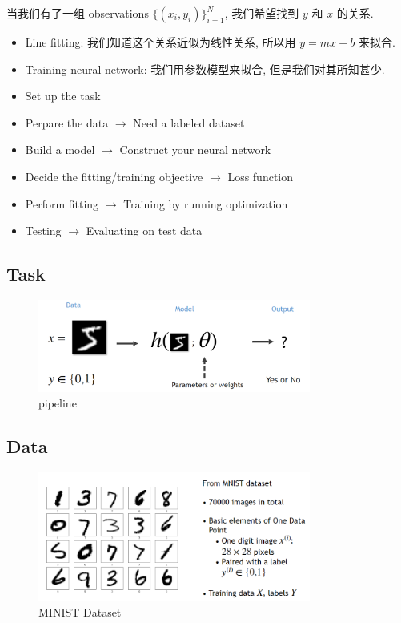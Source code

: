 \documentclass[lang=cn,10pt,green]{elegantbook}
\begin{document}
当我们有了一组 observations $\{(x_i, y_i)\}_{i=1}^N$, 我们希望找到 $y$ 和 $x$ 的关系.
\begin{itemize}
    \item Line fitting: 我们知道这个关系近似为线性关系, 所以用 $y = mx + b$ 来拟合.
    \item Training neural network: 我们用参数模型来拟合, 但是我们对其所知甚少.
\end{itemize}
\begin{definition}[Outline]
    \begin{itemize}
        \item Set up the task
        \item Perpare the data $\to$ Need a labeled dataset
        \item Build a model $\to$ Construct your neural network
        \item Decide the fitting/training objective $\to$ Loss function
        \item Perform fitting $\to$ Training by running optimization
        \item Testing $\to$ Evaluating on test data
    \end{itemize}
\end{definition}

\subsection{Task}
\begin{figure}[htbp]
    \centering
    \includegraphics[width=0.8\textwidth]{figures/ministdataset.png}
    \caption{pipeline}
    \label{fig:ml-pipeline}
\end{figure}

\clearpage

\subsection{Data}

\begin{figure}[htbp]
    \centering
    \includegraphics[width=0.8\textwidth]{figures/Mnistdataset.png}
    \caption{MINIST Dataset}
    \label{fig:ml-dataset}
\end{figure}
\end{document}
